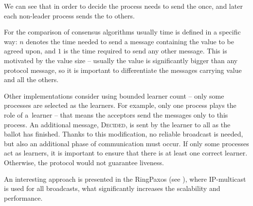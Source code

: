 We can see that in order to decide the process needs to send the \propose[] once, and later each non-leader process sends the \accept to others.

For the comparison of consensus algorithms usually time is defined in a specific way: $n$ denotes the time needed to send a message containing the value to be agreed upon, and $1$ is the time required to send any other message. This is motivated by the value size -- usually the value is significantly bigger than any protocol message, so it is important to differentiate the messages carrying value and all the others.

Other implementations consider using bounded learner count -- only some processes are selected as the learners. For example, only one process plays the role of a~learner -- that means the acceptors send the \accept messages only to this process. An additional message, \textsc{Decided}, is sent by the learner to all as the ballot has finished. Thanks to this modification, no reliable broadcast is needed, but also an additional phase of communication must occur. If only some processes act as learners, it is important to ensure that there is at least one correct learner. Otherwise, the protocol would not guarantee liveness.

An interesting approach is presented in the RingPaxos (see \cite{Mar10}), where IP-multicast is used for all broadcasts, what significantly increases the scalability and performance.
